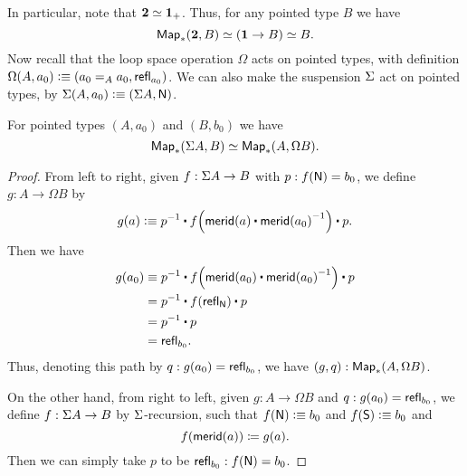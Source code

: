 In particular, note that $\eqv{\bool}{\unit_+}$.
Thus, for any pointed type $B$ we have
\[{\Map_*(\bool,B)} \simeq {(\unit \to B)}\simeq B.\]
%
Now recall that the loop space operation $\Omega$ acts on pointed types, with definition $\Omega(A,a_0) \defeq (\id[A]{a_0}{a_0},\refl{a_0})$.
We can also make the suspension $\susp$ act on pointed types, by $\susp(A,a_0)\defeq (\susp A,\north)$.

\begin{lem}\label{lem:susp-loop-adj}
  For pointed types $(A,a_0)$ and $(B,b_0)$ we have
  \[ \eqv{\Map_*(\susp A, B)}{\Map_*(A,\Omega B)}.\]
\end{lem}
\begin{proof}
  From left to right, given $f:\susp A \to B$ with $p:f(\north) = b_0$, we define $g:A \to \Omega B$ by
  \[g(a) \defeq \opp p \ct \ap f{\merid(a) \ct \opp{\merid(a_0)}} \ct p.\]
  Then we have
  \begin{align*}
    g(a_0) &\jdeq \opp p \ct \ap f{\merid(a_0) \ct \opp{\merid(a_0)}} \ct p\\
    &= \opp p \ct \ap f{\refl{\north}} \ct p\\
    &= \opp p \ct p\\
    &= \refl{b_0}.
  \end{align*}
  Thus, denoting this path by $q:g(a_0)=\refl{b_0}$, we have $(g,q):\Map_*(A,\Omega B)$.

  On the other hand, from right to left, given $g:A\to \Omega B$ and $q:g(a_0)=\refl{b_0}$, we define $f:\susp A \to B$ by $\susp$-recursion, such that $f(\north)\defeq b_0$ and $f(\south)\defeq b_0$ and
  \[ \ap f {\merid(a)} \defid g(a). \]
  Then we can simply take $p$ to be $\refl{b_0} : f(\north)= b_0$.


\end{proof}
